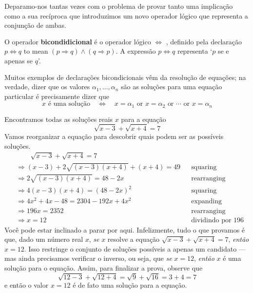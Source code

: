 \begin{itemizar}
Deparamo-nos tantas vezes com o problema de provar tanto uma implicação como a sua recíproca que introduzimos um novo operador lógico que representa a conjunção de ambas.

\begin{definition}
\label{defBiconditional}
O operador \textbf{bicondidicional} é o operador lógico $\Leftrightarrow$ , definido pela declaração $p \Leftrightarrow q$ to mean $(p \Rightarrow q) \wedge (q \Rightarrow p)$. A expressão $p \Leftrightarrow q$ representa `$p$ se e apenas se $q$'.
\end{definition}

Muitos exemplos de declarações bicondicionais vêm da resolução de equações; na verdade, dizer que os valores $\alpha_1,\dots,\alpha_n$ são as soluções para uma equação particular é precisamente dizer que
\[
x \text{ é uma solução} \quad \Leftrightarrow \quad x = \alpha_1 \text{ or } x = \alpha_2 \text{ or } \cdots \text{ or } x = \alpha_n
\]

\begin{example}
\label{exSolveSqrtFirstExample}
Encontramos todas as soluções reais $x$ para a equação
\[
\sqrt{x-3} + \sqrt{x+4} = 7
\]
Vamos reorganizar a equação para descobrir quais podem ser as possíveis soluções.
\begin{align*}
&\phantom{\Rightarrow\;\;} \sqrt{x-3} + \sqrt{x+4} = 7 && \\
&\Rightarrow (x-3) + 2\sqrt{(x-3)(x+4)} + (x+4) = 49 && \text{squaring} \\
&\Rightarrow 2\sqrt{(x-3)(x+4)} = 48-2x && \text{rearranging} \\
&\Rightarrow 4(x-3)(x+4) = (48-2x)^2 && \text{squaring} \\
&\Rightarrow 4x^2+4x-48 = 2304-192x+4x^2 && \text{expanding} \\
&\Rightarrow 196x = 2352 && \text{rearranging} \\
&\Rightarrow x=12 && \text{dividindo por $196$}
\end{align*}
Você pode estar inclinado a parar por aqui. Infelizmente, tudo o que provamos é que, dado um número real $x$, \textit{se} $x$ resolve a equação $\sqrt{x-3} + \sqrt{x+4} = 7$, \textit {então} $x=12$. Isso restringe o conjunto de soluções possíveis a apenas um candidato --- mas ainda precisamos verificar o inverso, ou seja, que \textit{se} $x=12$, \textit{então} $x$ é uma solução para o equação.
Assim, para finalizar a prova, observe que
\[
\sqrt{12-3} + \sqrt{12+4} = \sqrt{9} + \sqrt{16} = 3 + 4 = 7
\]
e então o valor $x=12$ é de fato uma solução para a equação.
\end{example}


\end{itemizar}
